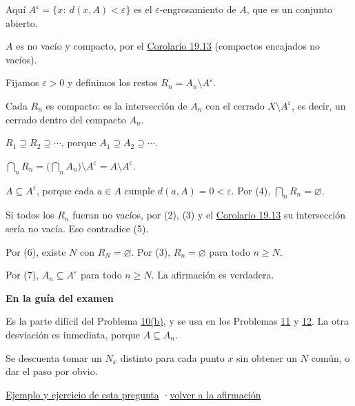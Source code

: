 \documentclass[11pt,a4paper]{article}
\providecommand{\lt}{<}\providecommand{\gt}{>}
\newcommand{\bloque}[1]{\par\smallskip\noindent\textbf{\color{acento}#1}\par}
\begin{document}
\begin{pasos}
\item[] Aquí $A^\varepsilon=\{x:\ d(x,A)\lt \varepsilon\}$ es el $\varepsilon$-engrosamiento de $A$, que es un conjunto abierto.
\item[(1)] $A$ es no vacío y compacto, por el \href{https://decostruttivismo.github.io/MAT2514-repaso/pdf/MAT2514_apuntes_completos.pdf\#nameddest=teorema.19.13}{Corolario 19.13} (compactos encajados no vacíos).
\item[] Fijamos $\varepsilon\gt 0$ y definimos los restos $R_n=A_n\setminus A^\varepsilon$.
\item[(2)] Cada $R_n$ es compacto: es la intersección de $A_n$ con el cerrado $X\setminus A^\varepsilon$, es decir, un cerrado dentro del compacto $A_n$.
\item[(3)] $R_1\supseteq R_2\supseteq\cdots$, porque $A_1\supseteq A_2\supseteq\cdots$.
\item[(4)] $\bigcap_nR_n=\bigl(\bigcap_nA_n\bigr)\setminus A^\varepsilon=A\setminus A^\varepsilon$.
\item[(5)] $A\subseteq A^\varepsilon$, porque cada $a\in A$ cumple $d(a,A)=0\lt \varepsilon$. Por (4), $\bigcap_nR_n=\varnothing$.
\item[(6)] Si todos los $R_n$ fueran no vacíos, por (2), (3) y el \href{https://decostruttivismo.github.io/MAT2514-repaso/pdf/MAT2514_apuntes_completos.pdf\#nameddest=teorema.19.13}{Corolario 19.13} su intersección sería no vacía. Eso contradice (5).
\item[(7)] Por (6), existe $N$ con $R_N=\varnothing$. Por (3), $R_n=\varnothing$ para todo $n\ge N$.
\item[] Por (7), $A_n\subseteq A^\varepsilon$ para todo $n\ge N$. La afirmación es verdadera.
\end{pasos}
\bloque{En la guía del examen}
\begin{pasos}
\item[] Es la parte difícil del Problema \hyperlink{prob-10}{10(b)}, y se usa en los Problemas \hyperlink{prob-11}{11} y \hyperlink{prob-12}{12}. La otra desviación es inmediata, porque $A\subseteq A_n$.
\item[] Se descuenta tomar un $N_x$ distinto para cada punto $x$ sin obtener un $N$ común, o dar el paso por obvio.
\end{pasos}
\par{}
\par{\small \hyperlink{e-12}{Ejemplo y ejercicio de esta pregunta} \quad·\quad \hyperlink{q-12}{volver a la afirmación}}
\end{document}
